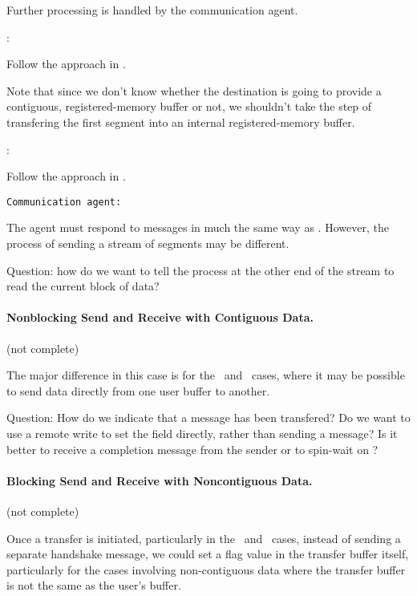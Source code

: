 \begin{mmadi}
\begin{via}
Further processing is handled by the communication agent.

:

Follow the approach in \tcpname.

Note that since we don't know whether the destination is going to provide a
contiguous, registered-memory buffer or not, we shouldn't take the step of
transfering the first segment into an internal registered-memory buffer.

:

Follow the approach in \tcpname.  

\texttt{Communication agent:}

The agent must respond to messages in much the same way as \tcpname.  However,
the process of sending a stream of segments may be different. 

Question: how do we want to tell the process at the other end of the stream to
read the current block of data?

\end{via}
\end{mmadi}

\paragraph{Nonblocking Send and Receive with Contiguous Data.}
(not complete)

The major difference in this case is for the \shmemname\ and \vianame\ cases,
where it may be possible to send data directly from one user buffer to
another.  

\begin{via}
  Question: How do we indicate that a message has been transfered?  Do we want
  to use a remote write to set the  field
  directly, rather than sending a message?  Is it better to receive a
  completion message from the sender or to spin-wait on
  ? 

\end{via}

\paragraph{Blocking Send and Receive with Noncontiguous Data.}
\label{sec:blocking-optimization}
(not complete)

Once a transfer is initiated, particularly in the \shmemname\ and \vianame\
cases, instead of sending a separate handshake message, we could set a flag
value in the transfer buffer itself, particularly for the cases involving
non-contiguous data where the transfer buffer is not the same as the user's
buffer.  


